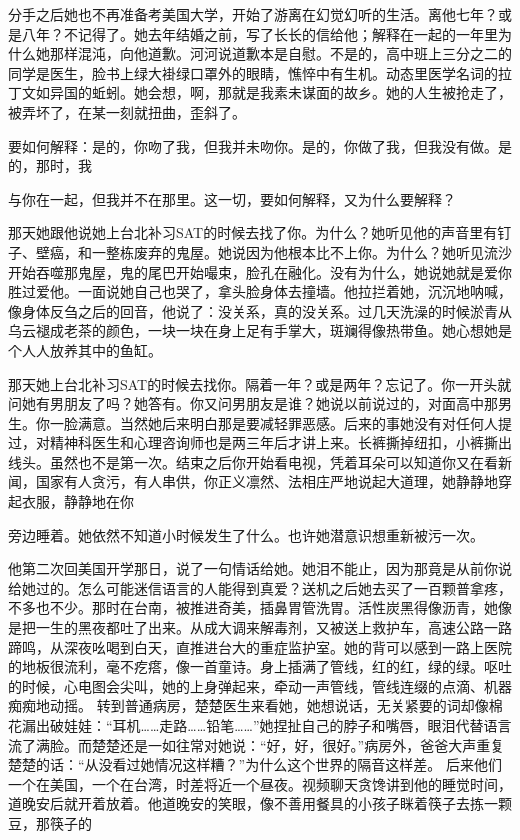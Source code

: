 \documentclass{article}
\begin{document}
分手之后她也不再准备考美国大学，开始了游离在幻觉幻听的生活。离他七年？或是八年？不记得了。她去年结婚之前，写了长长的信给他；解释在一起的一年里为什么她那样混沌，向他道歉。河河说道歉本是自慰。不是的，高中班上三分之二的同学是医生，脸书上绿大褂绿口罩外的眼睛，憔悴中有生机。动态里医学名词的拉丁文如异国的蚯蚓。她会想，啊，那就是我素未谋面的故乡。她的人生被抢走了，被弄坏了，在某一刻就扭曲，歪斜了。

要如何解释：是的，你吻了我，但我并未吻你。是的，你做了我，但我没有做。是的，那时，我

\newpage 

与你在一起，但我并不在那里。这一切，要如何解释，又为什么要解释？

那天她跟他说她上台北补习SAT的时候去找了你。为什么？她听见他的声音里有钉子、壁癌，和一整栋废弃的鬼屋。她说因为他根本比不上你。为什么？她听见流沙开始吞噬那鬼屋，鬼的尾巴开始嘬束，脸孔在融化。没有为什么，她说她就是爱你胜过爱他。一面说她自己也哭了，拿头脸身体去撞墙。他拉拦着她，沉沉地呐喊，像身体反刍之后的回音，他说了：没关系，真的没关系。过几天洗澡的时候淤青从乌云褪成老茶的颜色，一块一块在身上足有手掌大，斑斓得像热带鱼。她心想她是个人人放养其中的鱼缸。

那天她上台北补习SAT的时候去找你。隔着一年？或是两年？忘记了。你一开头就问她有男朋友了吗？她答有。你又问男朋友是谁？她说以前说过的，对面高中那男生。你一脸满意。当然她后来明白那是要减轻罪恶感。后来的事她没有对任何人提过，对精神科医生和心理咨询师也是两三年后才讲上来。长裤撕掉纽扣，小裤撕出线头。虽然也不是第一次。结束之后你开始看电视，凭着耳朵可以知道你又在看新闻，国家有人贪污，有人串供，你正义凛然、法相庄严地说起大道理，她静静地穿起衣服，静静地在你

\newpage 

旁边睡着。她依然不知道小时候发生了什么。也许她潜意识想重新被污一次。

他第二次回美国开学那日，说了一句情话给她。她泪不能止，因为那竟是从前你说给她过的。怎么可能迷信语言的人能得到真爱？送机之后她去买了一百颗普拿疼，不多也不少。那时在台南，被推进奇美，插鼻胃管洗胃。活性炭黑得像沥青，她像是把一生的黑夜都吐了出来。从成大调来解毒剂，又被送上救护车，高速公路一路蹄鸣，从深夜吆喝到白天，直推进台大的重症监护室。她的背可以感到一路上医院的地板很流利，毫不疙瘩，像一首童诗。身上插满了管线，红的红，绿的绿。呕吐的时候，心电图会尖叫，她的上身弹起来，牵动一声管线，管线连缀的点滴、机器痴痴地动摇。
转到普通病房，楚楚医生来看她，她想说话，无关紧要的词却像棉花漏出破娃娃：“耳机……走路……铅笔……”她捏扯自己的脖子和嘴唇，眼泪代替语言流了满脸。而楚楚还是一如往常对她说：“好，好，很好。”病房外，爸爸大声重复楚楚的话：“从没看过她情况这样糟？”为什么这个世界的隔音这样差。
后来他们一个在美国，一个在台湾，时差将近一个昼夜。视频聊天贪馋讲到他的睡觉时间，道晚安后就开着放着。他道晚安的笑眼，像不善用餐具的小孩子眯着筷子去拣一颗豆，那筷子的
\end{document}
